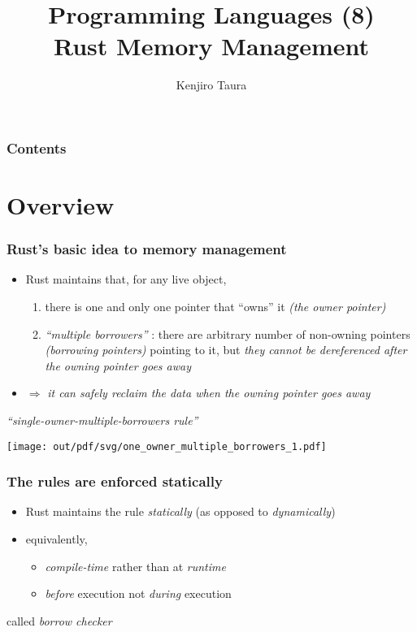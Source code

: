 \documentclass[12pt,dvipdfmx]{beamer}
\title{Programming Languages (8) \\
  Rust Memory Management}
\institute{}
\author{Kenjiro Taura}
\date{}
\newcommand{\mura}[1]{{\color{purple}#1}}
\newcommand{\ao}[1]{{\color{blue}#1}}
\newcommand{\aka}[1]{{\color{red}#1}}
\newcommand{\therustrule}{single-owner-multiple-borrowers}
\begin{document}
\maketitle

\begin{frame}
\frametitle{Contents}
\tableofcontents
\end{frame}

\section{Overview}
\begin{frame}
  \frametitle{Rust's basic idea to memory management}
  \begin{itemize}
  \item Rust maintains that, for any live object, 
    \begin{enumerate}
    \item there is one and only one pointer that ``owns'' it
      \mura{\it (the owner pointer)}
    \item \ao{\it ``multiple borrowers''} :
      there are arbitrary number of non-owning pointers
      \ao{\it (borrowing pointers)}
      pointing to it,
      but {\it they cannot be dereferenced after the owning pointer goes away}
    \end{enumerate}
  \item $\Rightarrow$
    {\it it can safely reclaim the data when the owning pointer goes away}
  \end{itemize}
  \begin{center}
    {\large\it ``{\it \therustrule} rule''}

    \texttt{[image: out/pdf/svg/one\_owner\_multiple\_borrowers\_1.pdf]}
  \end{center}
\end{frame}

\begin{frame}
  \frametitle{The rules are enforced statically}
  \begin{itemize}
  \item Rust maintains the rule \ao{\it statically}
    (as opposed to \aka{\it dynamically})
  \item equivalently,
    \begin{itemize}
    \item \ao{\it compile-time} rather than at \aka{\it runtime}
    \item \ao{\it before} execution not \aka{\it during} execution
    \end{itemize}
  \end{itemize}

  called \ao{\it borrow checker}
  
\end{frame}
\end{document}
